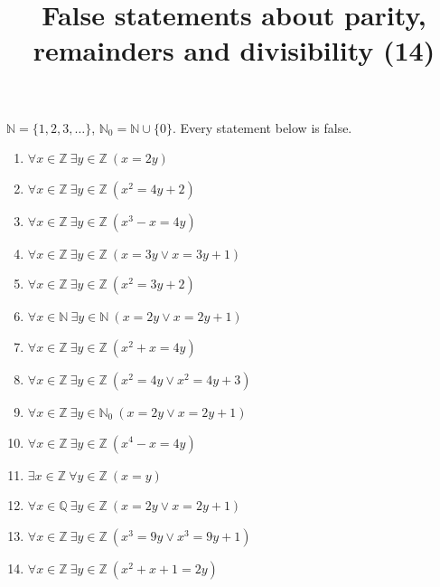 \documentclass[11pt,a4paper]{article}
\title{False statements about parity, remainders and divisibility (14)}
\author{}
\date{}
\begin{document}
\maketitle
$\mathbb{N} = \{1, 2, 3, \ldots\}$, $\mathbb{N}_{0} = \mathbb{N} \cup \{0\}$. Every statement below is false.

\begin{enumerate}
\item $\displaystyle \forall x \in \mathbb{Z}\ \exists y \in \mathbb{Z}\ (x = 2 y)$
\item $\displaystyle \forall x \in \mathbb{Z}\ \exists y \in \mathbb{Z}\ (x^{2} = 4 y + 2)$
\item $\displaystyle \forall x \in \mathbb{Z}\ \exists y \in \mathbb{Z}\ (x^{3} - x = 4 y)$
\item $\displaystyle \forall x \in \mathbb{Z}\ \exists y \in \mathbb{Z}\ (x = 3 y \lor x = 3 y + 1)$
\item $\displaystyle \forall x \in \mathbb{Z}\ \exists y \in \mathbb{Z}\ (x^{2} = 3 y + 2)$
\item $\displaystyle \forall x \in \mathbb{N}\ \exists y \in \mathbb{N}\ (x = 2 y \lor x = 2 y + 1)$
\item $\displaystyle \forall x \in \mathbb{Z}\ \exists y \in \mathbb{Z}\ (x^{2} + x = 4 y)$
\item $\displaystyle \forall x \in \mathbb{Z}\ \exists y \in \mathbb{Z}\ (x^{2} = 4 y \lor x^{2} = 4 y + 3)$
\item $\displaystyle \forall x \in \mathbb{Z}\ \exists y \in \mathbb{N}_{0}\ (x = 2 y \lor x = 2 y + 1)$
\item $\displaystyle \forall x \in \mathbb{Z}\ \exists y \in \mathbb{Z}\ (x^{4} - x = 4 y)$
\item $\displaystyle \exists x \in \mathbb{Z}\ \forall y \in \mathbb{Z}\ (x = y)$
\item $\displaystyle \forall x \in \mathbb{Q}\ \exists y \in \mathbb{Z}\ (x = 2 y \lor x = 2 y + 1)$
\item $\displaystyle \forall x \in \mathbb{Z}\ \exists y \in \mathbb{Z}\ (x^{3} = 9 y \lor x^{3} = 9 y + 1)$
\item $\displaystyle \forall x \in \mathbb{Z}\ \exists y \in \mathbb{Z}\ (x^{2} + x + 1 = 2 y)$
\end{enumerate}
\end{document}
